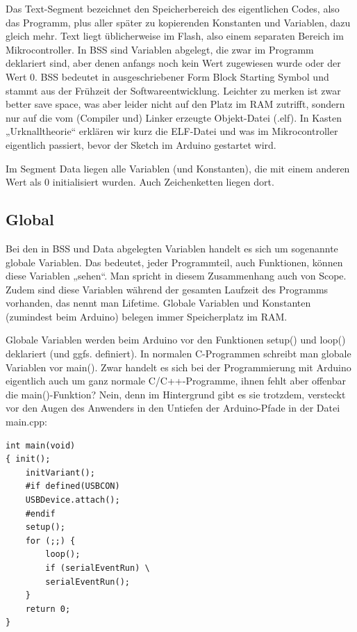 Das Text-Segment bezeichnet den Speicherbereich des eigentlichen Codes, also das Programm, plus aller später zu kopierenden Konstanten und Variablen, dazu gleich mehr. Text liegt üblicherweise im Flash, also einem separaten Bereich im Mikrocontroller. In BSS sind Variablen abgelegt, die zwar im Programm deklariert sind, aber denen anfangs noch kein Wert zugewiesen wurde oder der Wert 0. BSS bedeutet in ausgeschriebener Form Block Starting Symbol und stammt aus der Frühzeit der Softwareentwicklung. Leichter zu merken ist zwar better save space, was aber leider nicht auf den Platz im RAM zutrifft, sondern nur auf die vom (Compiler und) Linker erzeugte Objekt-Datei (.elf). In Kasten „Urknalltheorie“ erklären wir kurz die ELF-Datei und was im Mikrocontroller eigentlich passiert, bevor der Sketch im Arduino gestartet wird.

Im Segment Data liegen alle Variablen (und Konstanten), die mit einem anderen Wert als 0 initialisiert wurden. Auch Zeichenketten liegen dort.

\subsection{Global}

Bei den in BSS und Data abgelegten Variablen handelt es sich um sogenannte globale Variablen. Das bedeutet, jeder Programmteil, auch Funktionen, können diese Variablen „sehen“. Man spricht in diesem Zusammenhang auch von Scope. Zudem sind diese Variablen während der gesamten Laufzeit des Programms vorhanden, das nennt man Lifetime. Globale Variablen und Konstanten (zumindest beim Arduino) belegen immer Speicherplatz im RAM.

Globale Variablen werden beim Arduino vor den Funktionen setup() und loop() deklariert (und ggfs. definiert). In normalen C-Programmen schreibt man globale Variablen vor main(). Zwar handelt es sich bei der Programmierung mit Arduino eigentlich auch um ganz normale C/C++-Programme, ihnen fehlt aber offenbar die main()-Funktion? Nein, denn im Hintergrund gibt es sie trotzdem, versteckt vor den Augen des Anwenders in den Untiefen der Arduino-Pfade in der Datei main.cpp:

\begin{lstlisting}
int main(void)
{ init();
    initVariant();
    #if defined(USBCON)
    USBDevice.attach();
    #endif
    setup();
    for (;;) {
        loop();
        if (serialEventRun) \
        serialEventRun();
    }
    return 0;
}
\end{lstlisting}


